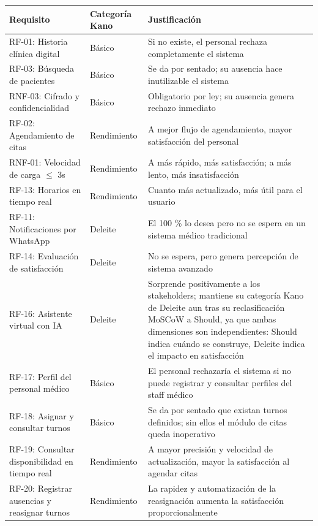 \documentclass[11pt,a4paper]{article}
\begin{document}
	\begin{longtable}{p{} p{} p{}}
		
		\toprule
		\textbf{Requisito} &
		\textbf{Categoría Kano} &
		\textbf{Justificación} \\
		\midrule
		\endhead
		
		\bottomrule
		\endlastfoot
		RF-01: Historia clínica digital & Básico & Si no existe, el personal rechaza completamente el sistema \\
		RF-03: Búsqueda de pacientes & Básico & Se da por sentado; su ausencia hace inutilizable el sistema \\
		RNF-03: Cifrado y confidencialidad & Básico & Obligatorio por ley; su ausencia genera rechazo inmediato \\
		RF-02: Agendamiento de citas & Rendimiento & A mejor flujo de agendamiento, mayor satisfacción del personal \\
		RNF-01: Velocidad de carga \(\leq\) 3s & Rendimiento & A más rápido, más satisfacción; a más lento, más insatisfacción \\
		RF-13: Horarios en tiempo real & Rendimiento & Cuanto más actualizado, más útil para el usuario \\
		RF-11: Notificaciones por WhatsApp & Deleite & El 100 \% lo desea pero no se espera en un sistema médico tradicional \\
		RF-14: Evaluación de satisfacción & Deleite & No se espera, pero genera percepción de sistema avanzado \\
		RF-16: Asistente virtual con IA & Deleite & Sorprende positivamente a los stakeholders; mantiene su categoría Kano de Deleite aun tras su reclasificación MoSCoW a Should, ya que ambas dimensiones son independientes: Should indica cuándo se construye, Deleite indica el impacto en satisfacción \\
		RF-17: Perfil del personal médico & Básico & El personal rechazaría el sistema si no puede registrar y consultar perfiles del staff médico \\
		RF-18: Asignar y consultar turnos & Básico & Se da por sentado que existan turnos definidos; sin ellos el módulo de citas queda inoperativo \\
		RF-19: Consultar disponibilidad en tiempo real & Rendimiento & A mayor precisión y velocidad de actualización, mayor la satisfacción al agendar citas \\
		RF-20: Registrar ausencias y reasignar turnos & Rendimiento & La rapidez y automatización de la reasignación aumenta la satisfacción proporcionalmente \\

\end{longtable}
\end{document}
